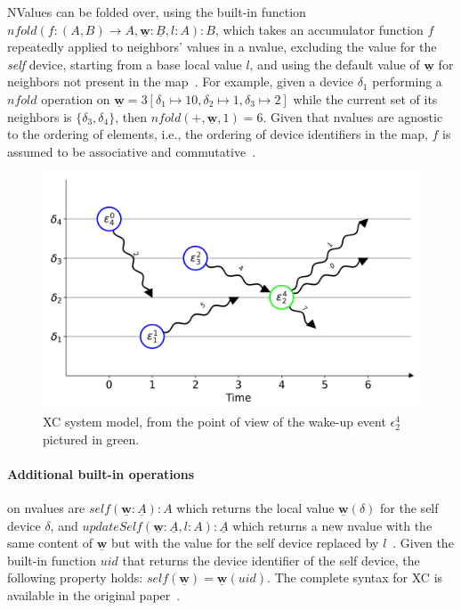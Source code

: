 NValues can be folded over, using the built-in function $nfold(f : (A, B) \rightarrow A, \underline{\mathbf{w}} : \underline{B}, l : A) : B$, which takes an accumulator function $f$ repeatedly applied to neighbors' values in a nvalue, excluding the value for the \textit{self} device, starting from a base local value $l$, and using the default value of $\underline{\mathbf{w}}$ for neighbors not present in the map~\cite{xc}.
%
For example, given a device $\delta_1$ performing a $nfold$ operation on $\underline{\mathbf{w}} = 3[\delta_1 \mapsto 10, \delta_2 \mapsto 1, \delta_3 \mapsto 2]$ while the current set of its neighbors is $\{\delta_3, \delta_4\}$, then $nfold(+, \underline{\mathbf{w}}, 1) = 6$.
%
Given that nvalues are agnostic to the ordering of elements, i.e., the ordering of device identifiers in the map, $f$ is assumed to be associative and commutative~\cite{xc}.

\begin{figure}
    \centering
    \includegraphics[width=.8\linewidth]{figures/nvalues-example.png}
    \caption{\ac{XC} system model, from the point of view of the wake-up event $\epsilon_2^4$ pictured in green.}
    \label{fig:xc-nvalues-exampke}
\end{figure}

\paragraph{Additional built-in operations} on nvalues are $self(\underline{\mathbf{w}} : \underline{A}) : A$ which returns the local value $\underline{\mathbf{w}}(\delta)$ for the self device $\delta$, and $updateSelf(\underline{\mathbf{w}} : \underline{A}, l : A) : \underline{A}$ which returns a new nvalue with the same content of $\underline{\mathbf{w}}$ but with the value for the self device replaced by $l$~\cite{xc}.
%
Given the built-in function $uid$ that returns the device identifier of the self device, the following property holds: $self(\underline{\mathbf{w}}) = \underline{\mathbf{w}}(uid)$.
%
The complete syntax for \ac{XC} is available in the original paper~\cite[p. 4]{xc}.

